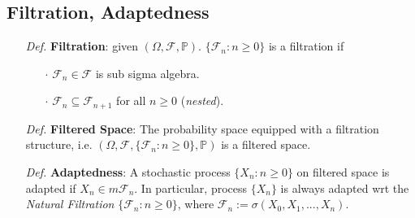 \documentclass[a4paper,12pt,twoside]{book}
\begin{document}
\subsection{Filtration, Adaptedness}
\begin{itemize}
	\item[\textit{Def.}] \textbf{Filtration}: given $(\Omega, \mathcal{F}, \mathbb{P})$. $\{\mathcal{F}_n:n\geq 0\}$ is a filtration if
	\begin{itemize}
		\item[$\cdot$] $\mathcal{F}_n \in \mathcal{F}$ is sub sigma algebra.
		\item[$\cdot$] $\mathcal{F}_n \subseteq \mathcal{F}_{n+1}$ for all $n\geq 0$ (\textit{nested}).
	\end{itemize}

	\item[\textit{Def.}] \textbf{Filtered Space}: The probability space equipped with a filtration structure, i.e. $(\Omega, \mathcal{F}, \{\mathcal{F}_n: n\geq 0\},\mathbb{P})$ is a filtered space.

	\item[\textit{Def.}] \textbf{Adaptedness}: A stochastic process $\{X_n: n\geq 0\}$ on filtered space is adapted if $X_n \in m \mathcal{F}_n$. \newline
	In particular, process $\{X_n\}$ is always adapted wrt the \textit{Natural Filtration} $\{\mathcal{F}_n: n\geq 0\}$, where $\mathcal{F}_n := \sigma(X_0, X_1, ..., X_n)$.
\end{itemize}

\end{document}
